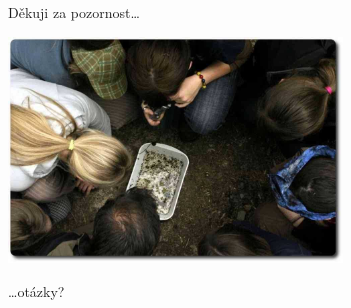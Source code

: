 \documentclass[compress, ucs, xelatex, xcolor=dvipsnames, print,
  hyperref={
    bookmarks=true,
    unicode=true,
    colorlinks=true,
    plainpages=false,
    pdfkeywords={Skaut, Junak, Skauting, Vychovna metoda},
    linkcolor=Black,
    anchorcolor=Black,
    citecolor=OliveGreen,
    filecolor=OliveGreen,
    menucolor=Black,
    urlcolor=OliveGreen,
    pdftex}
  ]{beamer}
\begin{document}
\begin{frame}{Děkuji za pozornost\ldots}
  \begin{center}
    \includegraphics[height=6cm]{zaver.jpg}
  \end{center}
  \begin{flushright}
    \begin{large}
      \ldots otázky?
    \end{large}
  \end{flushright}
\end{frame}
\end{document}
